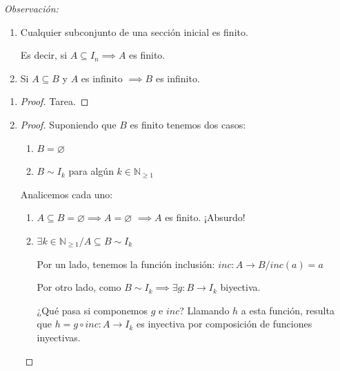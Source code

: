 \bigskip
\textit{Observación:}
\begin{enumerate}
    \item Cualquier subconjunto de una sección inicial es finito. 

     Es decir, si $A \subseteq I_n \implies A$ es finito.
    \item Si $A \subseteq B$ y $A$ es infinito $\implies B$ es infinito.
\end{enumerate}


\begin{enumerate}
    
    
    \item \begin{proof} Tarea. %
    \end{proof}
    \item \begin{proof} \phantom{.}

            Suponiendo que $B$ es finito tenemos dos casos:
            \begin{enumerate}
                \item $B = \varnothing$
                \item $B \sim I_k$ para algún $k \in \mathbb{N}_{\geq 1}$
            \end{enumerate}

            Analicemos cada uno:
            \begin{enumerate}
                \item $A \subseteq B = \varnothing \implies A = \varnothing$
                    $\implies A$ es finito. ¡Absurdo!
                \item $\exists k \in \mathbb{N}_{\geq 1} / 
                    A \subseteq B \sim I_k$

                    Por un lado, tenemos la función inclusión: 
                    $inc: A \to B/ inc(a) = a$ 

                    Por otro lado, como
                    $B \sim I_k \implies \exists g: B \to I_k$ biyectiva.

                    \smallskip

                    ¿Qué pasa si componemos $g$ e $inc$?
                    Llamando $h$ a esta función, resulta que
                    $h = g \circ inc: A \to I_k$ es inyectiva por composición
                    de funciones inyectivas.


\end{enumerate}
\end{proof}
\end{enumerate}
